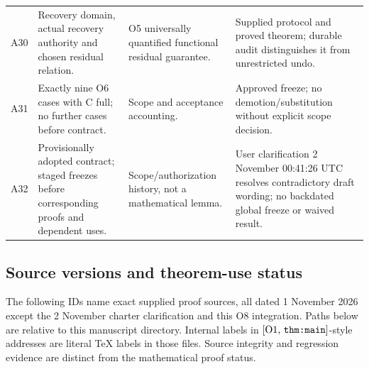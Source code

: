 \documentclass[11pt,a4paper]{article}
\theoremstyle{definition}
\newcommand{\Addr}[2]{\textup{[#1, \texttt{#2}]}}
\begin{document}
\begin{longtable}{@{}p{.08\linewidth}p{.30\linewidth}p{.28\linewidth}p{.25\linewidth}@{}}
A30&Recovery domain, actual recovery authority and chosen residual relation.&
O5 universally quantified functional residual guarantee.&Supplied protocol and
proved theorem; durable audit distinguishes it from unrestricted undo.\\
A31&Exactly nine O6 cases with C full; no further cases before contract.&
Scope and acceptance accounting.&Approved freeze; no demotion/substitution
without explicit scope decision.\\
A32&Provisionally adopted contract; staged freezes before corresponding
proofs and dependent uses.&Scope/authorization history, not a mathematical
lemma.&User clarification 2 November 00:41:26 UTC resolves contradictory
draft wording; no backdated global freeze or waived result.\\
\bottomrule
\end{longtable}
\normalsize

\subsection{Source versions and theorem-use status}
The following IDs name exact supplied proof sources, all dated
1 November 2026 except the 2 November charter clarification and this O8
integration. Paths below are relative to this manuscript directory. Internal labels
in \(\Addr{O1}{thm:main}\)-style addresses are literal TeX labels in
those files. Source integrity and regression evidence are distinct from
the mathematical proof status.
\end{document}
